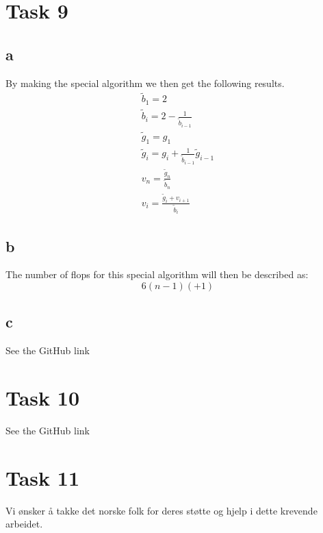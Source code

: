 \documentclass[english,notitlepage]{revtex4-1}  %
\begin{document}
\section*{Task 9}
    \subsection*{a}
        \label{sec:9a}
        By making the special algorithm we then get the following results. 
        \begin{align*}
                \tilde{b}_1 
            =   2\\
                \tilde{b}_i
            =   2 - \frac{1}{\tilde{b}_{i-1}}\\
                \tilde{g}_1 
            =   g_1\\
                \tilde{g}_i 
            =   g_i + \frac{1}{\tilde{b}_{i-1}}\tilde{g}_{i-1}\\
                v_n 
            =   \frac{\tilde{g}_n}{\tilde{b}_n}\\
                v_i 
            =   \frac{\tilde{g}_i+v_{i+1}}{\tilde{b}_i}
        \end{align*}
    \subsection*{b}
        \label{sec:9b}
        The number of flops for this special algorithm will then be described as: $$6(n-1)(+1)$$
    \subsection*{c}
        \label{sec:9c}
        See the GitHub link


\section*{Task 10}
See the GitHub link


\section*{Task 11}
        



\begin{acknowledgements}
Vi ønsker å takke det norske folk for deres støtte og hjelp i dette krevende arbeidet. 
\end{acknowledgements}

   
\end{document}
